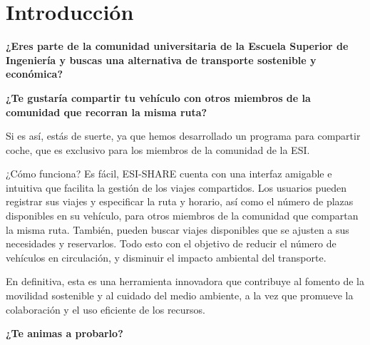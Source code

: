 

\section{Introducción}

\begin{center}
\textbf{¿Eres parte de la comunidad universitaria de la Escuela Superior de Ingeniería y buscas una alternativa de transporte sostenible y económica?}\\
\end{center}
\begin{center}
\textbf{¿Te gustaría compartir tu vehículo con otros miembros de la comunidad que recorran la misma ruta?}\\
\end{center}
Si es así, estás de suerte, ya que hemos desarrollado un programa para compartir coche, que es exclusivo para los miembros de la comunidad de la ESI.

\bigskip

¿Cómo funciona? Es fácil, ESI-SHARE cuenta con una interfaz amigable e intuitiva que facilita la gestión de los viajes compartidos.  Los usuarios pueden registrar sus
viajes y especificar la ruta y horario, así como el número de plazas disponibles en su vehículo, para otros miembros de la comunidad que compartan la misma ruta.
También, pueden buscar viajes disponibles que se ajusten a sus necesidades y reservarlos. Todo esto con el objetivo de reducir el número de vehículos en circulación,
y disminuir el impacto ambiental del transporte.

\bigskip

En definitiva, esta es una herramienta innovadora que contribuye al fomento de la movilidad sostenible y al cuidado del medio ambiente, a la vez que
promueve la colaboración y el uso eficiente de los recursos.
\bigskip
\begin{center}
\textbf{¿Te animas a probarlo?}
\end{center}